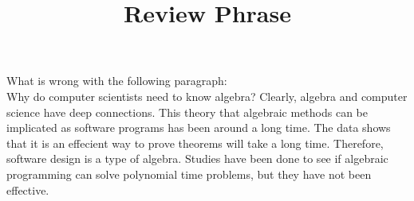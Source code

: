 \documentclass{article}
\title{Review Phrase}
\begin{document}
\maketitle
What is wrong with the following paragraph:\\
\Large
Why do computer scientists need to know algebra? Clearly, algebra and computer science have deep connections. This theory that algebraic methods can be implicated as software programs has been around a long time. The data shows that it is an effecient way to prove theorems will take a long time. Therefore, software design is a type of algebra. Studies have been done to see if algebraic programming can solve polynomial time problems, but they have not been effective.
\end{document}
